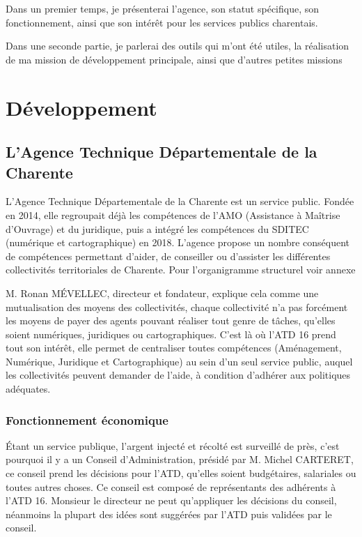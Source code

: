 \documentclass[a4paper,12pt]{report}
\begin{document}
\vspace{1em}

Dans un premier temps, je présenterai l'agence, son statut spécifique, son fonctionnement, ainsi que son intérêt pour les services publics charentais.


Dans une seconde partie, je parlerai des outils qui m'ont été utiles, la réalisation de ma mission de développement principale, ainsi que d'autres petites missions

\chapter{Développement}

\section{L'Agence Technique Départementale de la Charente}
L'Agence Technique Départementale de la Charente est un service public. Fondée en 2014, elle regroupait déjà les compétences de l'AMO (Assistance à Maîtrise d'Ouvrage) et du juridique, puis a intégré les compétences du SDITEC (numérique et cartographique) en 2018. L'agence propose un nombre conséquent de compétences permettant d'aider, de conseiller ou d'assister les différentes collectivités territoriales de Charente. Pour l'organigramme structurel voir annexe


M. Ronan MÉVELLEC, directeur et fondateur, explique cela comme une mutualisation des moyens des collectivités, chaque collectivité n'a pas forcément les moyens de payer des agents pouvant réaliser tout genre de tâches, qu'elles soient numériques, juridiques ou cartographiques. C'est là où l'ATD 16 prend tout son intérêt, elle permet de centraliser toutes compétences (Aménagement, Numérique, Juridique et Cartographique) au sein d'un seul service public, auquel les collectivités peuvent demander de l'aide, à condition d'adhérer aux politiques adéquates.

\subsection{Fonctionnement économique}

Étant un service publique, l'argent injecté et récolté est surveillé de près, c'est pourquoi il y a un Conseil d'Administration, présidé par M. Michel CARTERET, ce conseil prend les décisions pour l'ATD, qu'elles soient budgétaires, salariales ou toutes autres choses. Ce conseil est composé de représentants des adhérents à l'ATD 16. Monsieur le directeur ne peut qu'appliquer les décisions du conseil, néanmoins la plupart des idées sont suggérées par l'ATD puis validées par le conseil.
\end{document}
